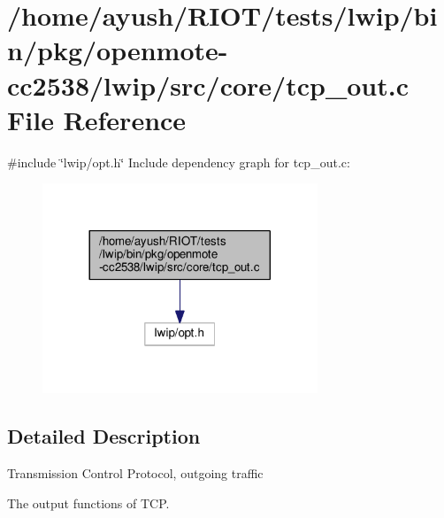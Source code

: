 \hypertarget{openmote-cc2538_2lwip_2src_2core_2tcp__out_8c}{}\section{/home/ayush/\+R\+I\+O\+T/tests/lwip/bin/pkg/openmote-\/cc2538/lwip/src/core/tcp\+\_\+out.c File Reference}
\label{openmote-cc2538_2lwip_2src_2core_2tcp__out_8c}
{\ttfamily \#include \char`\"{}lwip/opt.\+h\char`\"{}}\newline
Include dependency graph for tcp\+\_\+out.\+c\+:
\nopagebreak
\begin{figure}[H]
\begin{center}
\leavevmode
\includegraphics[width=233pt]{openmote-cc2538_2lwip_2src_2core_2tcp__out_8c__incl}
\end{center}
\end{figure}


\subsection{Detailed Description}
Transmission Control Protocol, outgoing traffic

The output functions of T\+CP. 